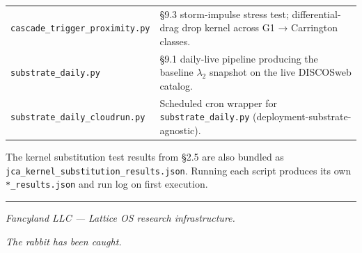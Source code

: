 \documentclass[
]{article}
\begin{document}
{\begin{longtable}[]{@{}
  >{\raggedright\arraybackslash}p{}
  >{\raggedright\arraybackslash}p{}@{}}
\texttt{cascade\_trigger\_proximity.py} & §9.3 storm-impulse stress
test; differential-drag drop kernel across G1 → Carrington classes. \\
\texttt{substrate\_daily.py} & §9.1 daily-live pipeline producing the
baseline \(\lambda_2\) snapshot on the live DISCOSweb catalog. \\
\texttt{substrate\_daily\_cloudrun.py} & Scheduled cron wrapper for
\texttt{substrate\_daily.py} (deployment-substrate-agnostic). \\
\end{longtable}
}

The kernel substitution test results from §2.5 are also bundled as
\texttt{jca\_kernel\_substitution\_results.json}. Running each script
produces its own \texttt{*\_results.json} and run log on first
execution.

\vspace{3em}
\begin{center}
\rule{0.4\textwidth}{0.5pt}

\vspace{0.8em}

\textit{Fancyland LLC --- Lattice OS research infrastructure.}

\vspace{0.3em}

\textit{The rabbit has been caught.}
\end{center}
\end{document}
